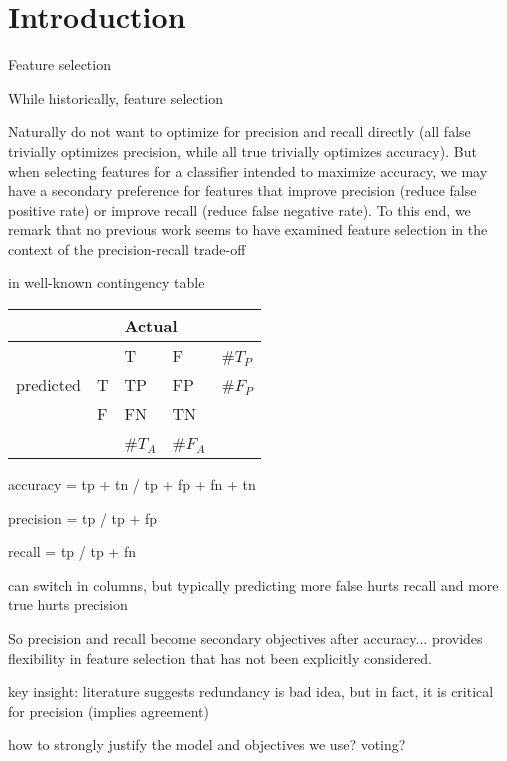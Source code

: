 \section{Introduction}

Feature selection~\cite{guyon_jmlr03} 

While historically, feature selection 

Naturally do not want to optimize for precision and recall directly (all false trivially optimizes precision, while all true trivially optimizes accuracy).  But when selecting features for a classifier intended to maximize accuracy, we may have a secondary preference for features that improve precision (reduce false positive rate) or improve recall (reduce false negative rate).  To this end, we remark that no previous work seems to have examined feature selection in the context of the precision-recall trade-off

in well-known contingency table

{\centering
\begin{tabular}{|l||l|l|l|l|} \hline
          &   & \multicolumn{2}{|l|}{Actual} & \\ \hline \hline
          &   &  T & F & \#$T_P$\\ \hline
predicted & T & TP & FP & \#$F_P$ \\ \hline
          & F & FN & TN & \\ \hline
          &   & \#$T_A$ & \#$F_A$ & \\ \hline
\end{tabular}}

accuracy = tp + tn / tp + fp + fn + tn

precision = tp / tp + fp

recall = tp / tp + fn

can switch in columns, but typically predicting more false hurts recall and more true hurts precision

So precision and recall become secondary objectives after accuracy... provides flexibility in feature selection that has not been explicitly considered.


\COMMENT
key insight: literature suggests redundancy is bad idea, but in fact, it is critical for precision (implies agreement)

how to strongly justify the model and objectives we use?  voting?

